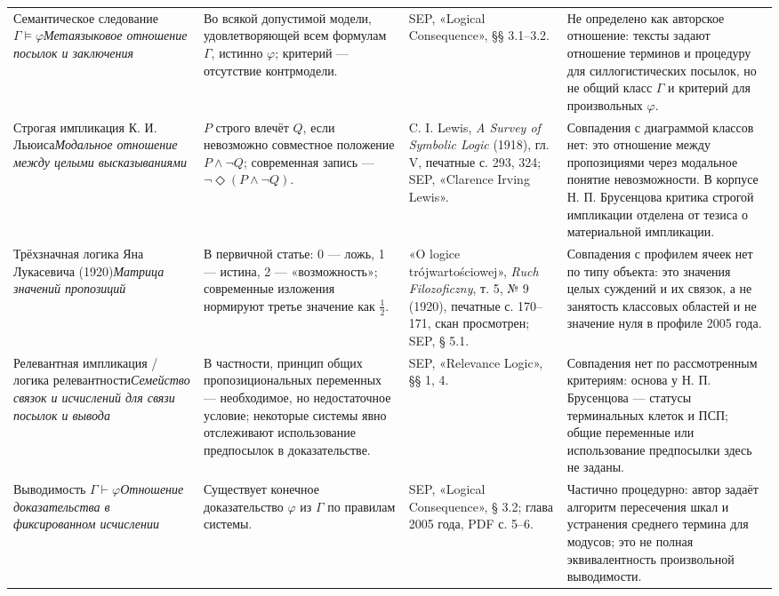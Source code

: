 \documentclass[12pt,a4paper]{article}
\begin{document}
{\begin{longtable}{P{0.18\textwidth}P{0.28\textwidth}P{0.18\textwidth}P{0.23\textwidth}}
Семантическое следование \(\Gamma\models\varphi\)\newline\emph{Метаязыковое отношение посылок и заключения} & Во всякой допустимой модели, удовлетворяющей всем формулам \(\Gamma\), истинно \(\varphi\); критерий — отсутствие контрмодели. & SEP, «Logical Consequence», §§ 3.1–3.2. & Не определено как авторское отношение: тексты задают отношение терминов и процедуру для силлогистических посылок, но не общий класс \(\Gamma\) и критерий для произвольных \(\varphi\). \\
Строгая импликация К. И. Льюиса\newline\emph{Модальное отношение между целыми высказываниями} & \(P\) строго влечёт \(Q\), если невозможно совместное положение \(P\land\neg Q\); современная запись — \(\neg\Diamond(P\land\neg Q)\). & C. I. Lewis, \emph{A Survey of Symbolic Logic} (1918), гл. V, печатные с. 293, 324; SEP, «Clarence Irving Lewis». & Совпадения с диаграммой классов нет: это отношение между пропозициями через модальное понятие невозможности. В корпусе Н. П. Брусенцова критика строгой импликации отделена от тезиса о материальной импликации. \\
Трёхзначная логика Яна Лукасевича (1920)\newline\emph{Матрица значений пропозиций} & В первичной статье: 0 — ложь, 1 — истина, 2 — «возможность»; современные изложения нормируют третье значение как \(\tfrac12\). & «O logice trójwartościowej», \emph{Ruch Filozoficzny}, т. 5, № 9 (1920), печатные с. 170–171, скан просмотрен; SEP, § 5.1. & Совпадения с профилем ячеек нет по типу объекта: это значения целых суждений и их связок, а не занятость классовых областей и не значение нуля в профиле 2005 года. \\
Релевантная импликация / логика релевантности\newline\emph{Семейство связок и исчислений для связи посылок и вывода} & В частности, принцип общих пропозициональных переменных — необходимое, но недостаточное условие; некоторые системы явно отслеживают использование предпосылок в доказательстве. & SEP, «Relevance Logic», §§ 1, 4. & Совпадения нет по рассмотренным критериям: основа у Н. П. Брусенцова — статусы терминальных клеток и ПСП; общие переменные или использование предпосылки здесь не заданы. \\
Выводимость \(\Gamma\vdash\varphi\)\newline\emph{Отношение доказательства в фиксированном исчислении} & Существует конечное доказательство \(\varphi\) из \(\Gamma\) по правилам системы. & SEP, «Logical Consequence», § 3.2; глава 2005 года, PDF с. 5–6. & Частично процедурно: автор задаёт алгоритм пересечения шкал и устранения среднего термина для модусов; это не полная эквивалентность произвольной выводимости. \\

\end{longtable}}
\end{document}
